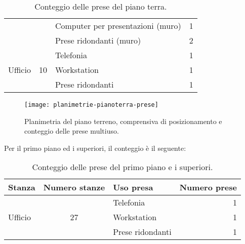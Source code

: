 \begin{table}[h]
\begin{adjustbox}{center}
\begin{tabular}{@{}lclr@{}}
                                     &                     & Computer per presentazioni (muro)                  & 1            \\
                                     &                     & Prese ridondanti (muro)                            & 2            \\ \midrule
      \multirow{3}{*}{Ufficio}       & \multirow{3}{*}{10} & Telefonia                                          & 1            \\
                                     &                     & Workstation                                        & 1            \\
                                     &                     & Prese ridondanti                                   & 1            \\ \bottomrule
    \end{tabular}
  \end{adjustbox}
  \caption{\label{tab:prese-terra} Conteggio delle prese del piano terra.}
\end{table}

\begin{figure}[ht]
  \texttt{[image: planimetrie-pianoterra-prese]}
  \caption{Planimetria del piano terreno, comprensiva di posizionamento e conteggio delle prese multiuso.}\label{fig:planimetria-terreno-prese}
\end{figure}

\newpage
Per il primo piano ed i superiori, il conteggio è il seguente:

\begin{table}[ht]
  \begin{tabular}{@{}lclr@{}}
    \toprule
    Stanza                   & Numero stanze       & Uso presa        & Numero prese \\ \midrule
    \multirow{3}{*}{Ufficio} & \multirow{3}{*}{27} & Telefonia        & 1            \\
                             &                     & Workstation      & 1            \\
                             &                     & Prese ridondanti & 1            \\ \bottomrule
  \end{tabular}
  \caption{\label{tab:prese-1} Conteggio delle prese del primo piano e i superiori.}
\end{table}

